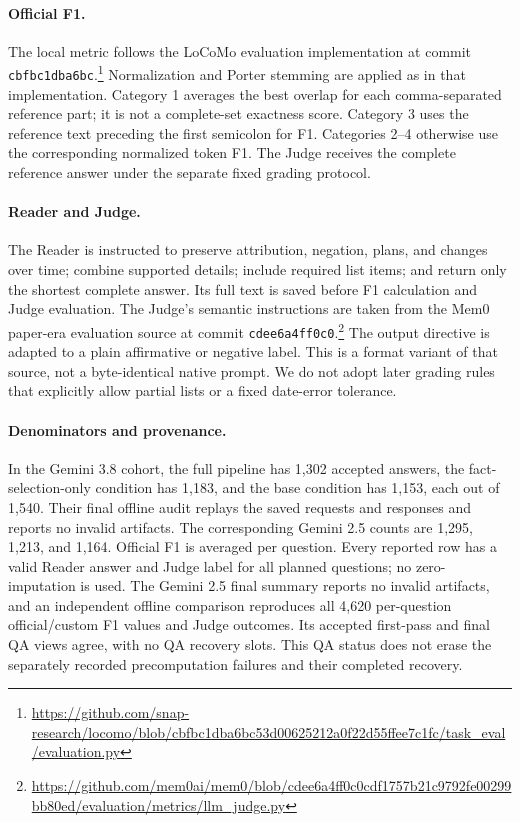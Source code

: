 \documentclass[11pt]{article}
\begin{document}
\paragraph{Official F1.}
The local metric follows the LoCoMo evaluation implementation at commit \texttt{cbfbc1dba6bc}.\footnote{\url{https://github.com/snap-research/locomo/blob/cbfbc1dba6bc53d00625212a0f22d55ffee7c1fc/task_eval/evaluation.py}} Normalization and Porter stemming are applied as in that implementation. Category 1 averages the best overlap for each comma-separated reference part; it is not a complete-set exactness score. Category 3 uses the reference text preceding the first semicolon for F1. Categories 2--4 otherwise use the corresponding normalized token F1. The Judge receives the complete reference answer under the separate fixed grading protocol.

\paragraph{Reader and Judge.}
The Reader is instructed to preserve attribution, negation, plans, and changes over time; combine supported details; include required list items; and return only the shortest complete answer. Its full text is saved before F1 calculation and Judge evaluation. The Judge's semantic instructions are taken from the Mem0 paper-era evaluation source at commit \texttt{cdee6a4ff0c0}.\footnote{\url{https://github.com/mem0ai/mem0/blob/cdee6a4ff0c0cdf1757b21c9792fe00299bb80ed/evaluation/metrics/llm_judge.py}} The output directive is adapted to a plain affirmative or negative label. This is a format variant of that source, not a byte-identical native prompt. We do not adopt later grading rules that explicitly allow partial lists or a fixed date-error tolerance.

\paragraph{Denominators and provenance.}
In the Gemini 3.8 cohort, the full pipeline has 1,302 accepted answers, the fact-selection-only condition has 1,183, and the base condition has 1,153, each out of 1,540. Their final offline audit replays the saved requests and responses and reports no invalid artifacts. The corresponding Gemini 2.5 counts are 1,295, 1,213, and 1,164. Official F1 is averaged per question. Every reported row has a valid Reader answer and Judge label for all planned questions; no zero-imputation is used. The Gemini 2.5 final summary reports no invalid artifacts, and an independent offline comparison reproduces all 4,620 per-question official/custom F1 values and Judge outcomes. Its accepted first-pass and final QA views agree, with no QA recovery slots. This QA status does not erase the separately recorded precomputation failures and their completed recovery.
\end{document}
